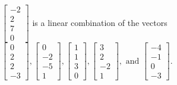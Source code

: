\begin{exercise}
\begin{exerciseStatement}
  \end{exerciseStatement}
  \begin{exerciseAnswer}
   \(\left[\begin{array}{c}
-2 \\
2 \\
7 \\
0
\end{array}\right]\) 
  	 is  
	a linear combination of the vectors \(\left[\begin{array}{c}
0 \\
2 \\
2 \\
-3
\end{array}\right] , \left[\begin{array}{c}
0 \\
-2 \\
-5 \\
1
\end{array}\right] , \left[\begin{array}{c}
1 \\
1 \\
3 \\
0
\end{array}\right] , \left[\begin{array}{c}
3 \\
2 \\
-2 \\
1
\end{array}\right] , \text{ and } \left[\begin{array}{c}
-4 \\
-1 \\
0 \\
-3
\end{array}\right]\).

	
  


  \end{exerciseAnswer}
\end{exercise}